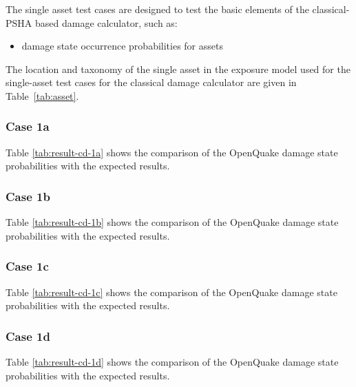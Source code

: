 The single asset test cases are designed to test the basic elements of the classical-PSHA based damage calculator, such as:

\begin{itemize}
\item damage state occurrence probabilities for assets
\end{itemize}

The location and taxonomy of the single asset in the exposure model used for the single-asset test cases for the classical damage calculator are given in Table~\ref{tab:asset}.


\subsubsection{Case 1a}



Table \ref{tab:result-cd-1a} shows the comparison of the OpenQuake damage state probabilities with the expected results.

\subsubsection{Case 1b}



Table \ref{tab:result-cd-1b} shows the comparison of the OpenQuake damage state probabilities with the expected results.

\subsubsection{Case 1c}



Table \ref{tab:result-cd-1c} shows the comparison of the OpenQuake damage state probabilities with the expected results.

\subsubsection{Case 1d}



Table \ref{tab:result-cd-1d} shows the comparison of the OpenQuake damage state probabilities with the expected results.

